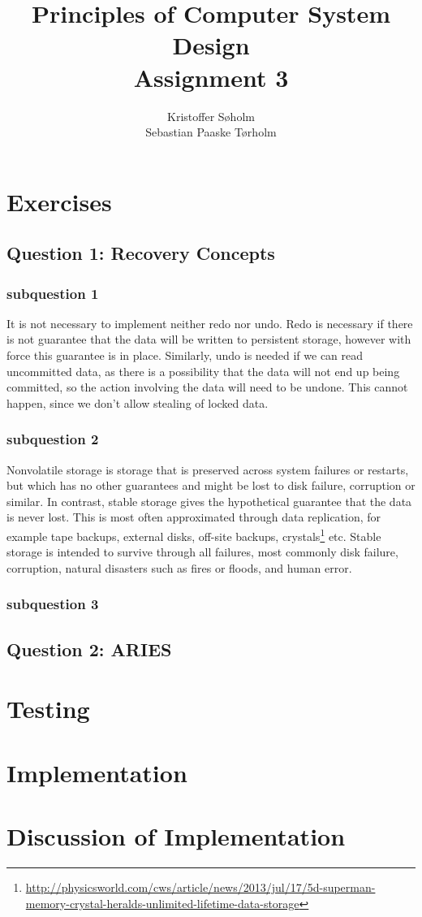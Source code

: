 \documentclass[11pt,a4paper]{article}
\title{Principles of Computer System Design\\Assignment 3}
\author{Kristoffer Søholm\\Sebastian Paaske Tørholm}
\begin{document}
\maketitle

\section{Exercises}
\subsection{Question 1: Recovery Concepts}
\subsubsection{subquestion 1}
It is not necessary to implement neither redo nor undo. Redo is necessary if
there is not guarantee that the data will be written to persistent storage,
however with force this guarantee is in place. Similarly, undo is needed if we
can read uncommitted data, as there is a possibility that the data will not end
up being committed, so the action involving the data will need to be undone.
This cannot happen, since we don't allow stealing of locked data.

\subsubsection{subquestion 2}
Nonvolatile storage is storage that is preserved across system failures or
restarts, but which has no other guarantees and might be lost to disk failure,
corruption or similar. In contrast, stable storage gives the hypothetical
guarantee that the data is never lost. This is most often approximated through
data replication, for example tape backups, external disks, off-site backups,
crystals\footnote{\url{http://physicsworld.com/cws/article/news/2013/jul/17/5d-superman-memory-crystal-heralds-unlimited-lifetime-data-storage}} etc. 
Stable storage is intended to survive through all failures, most commonly disk
failure, corruption, natural disasters such as fires or floods, and human
error.

\subsubsection{subquestion 3}


\subsection{Question 2: ARIES}


\section{Testing}

\section{Implementation}

\section{Discussion of Implementation}
\end{document}
